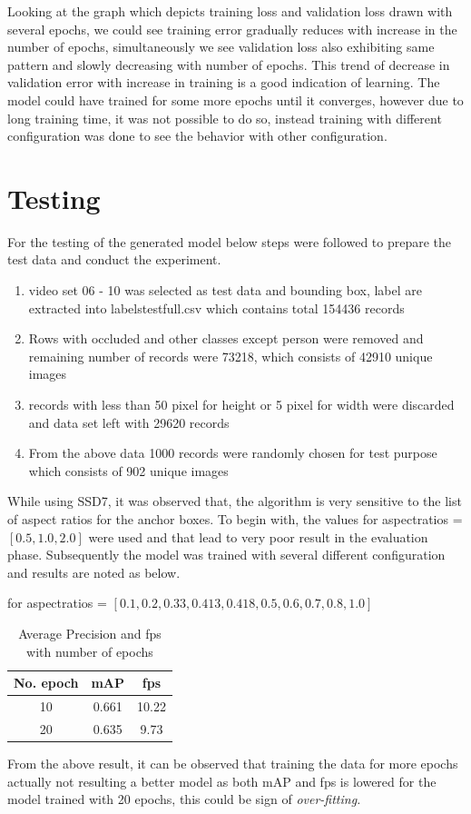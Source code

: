 \newpara
Looking at the graph which depicts training loss and validation loss drawn with several epochs, we could see training error gradually reduces with increase in the number of epochs, simultaneously we see validation loss also exhibiting same pattern and slowly decreasing with number of epochs. This trend of decrease in validation error with increase in training is a good indication of learning. The model could have trained for some more epochs until it converges, however due to long training time, it was not possible to do so, instead training with different configuration was done to see the behavior with other configuration.

\section{Testing} 
For the testing of the generated model below steps were followed to prepare the test data and conduct the experiment.
\begin{enumerate}
	\item video set 06 - 10 was selected as test data and bounding box, label are extracted into labels\textunderscore test\textunderscore full.csv which contains total 154436 records
	\item Rows with occluded and other classes except person were removed and remaining number of records were 73218, which consists of 42910 unique images 
	\item records with less than 50 pixel for height or 5 pixel for width were discarded and data set left with 29620 records
	\item From the above data 1000 records were randomly chosen for test purpose which consists of 902 unique images
\end{enumerate}

\newpara
While using SSD7, it was observed that, the algorithm is very sensitive to the list of aspect ratios for the anchor boxes. To begin with, the values for aspect\textunderscore ratios = $[0.5, 1.0, 2.0]$ were used and that lead to very poor result in the evaluation phase. Subsequently the model was trained with several different configuration and results are noted as below.

for aspect\textunderscore ratios = $[0.1, 0.2, 0.33, 0.413, 0.418, 0.5, 0.6, 0.7, 0.8, 1.0]$
\begin{table}[H]
\begin{center}
 \begin{tabular}{||c c c||} 
 \hline
 No. epoch & mAP & fps\\ [0.8ex] 
 \hline\hline
 10 & 0.661 & 10.22\\ 
 \hline
 20  & 0.635 & 9.73 \\
\hline
\end{tabular}
\caption{Average Precision and fps with number of epochs}
\end{center}
\end{table}
From the above result, it can be observed that training the data for more epochs actually not resulting a better model as both mAP and fps is lowered for the model trained with 20 epochs, this could be sign of \textit{over-fitting.}


